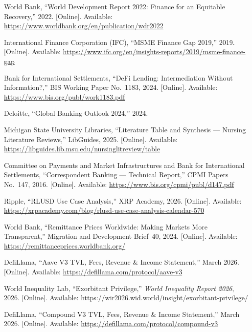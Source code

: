 \documentclass[12pt,a4paper]{report}
\begin{document}
{\begin{enumerate}[label={[\arabic*]}]
\item World Bank, ``World Development Report 2022: Finance for an Equitable Recovery,'' 2022. [Online]. Available: \url{https://www.worldbank.org/en/publication/wdr2022}

\item International Finance Corporation (IFC), ``MSME Finance Gap 2019,'' 2019. [Online]. Available: \url{https://www.ifc.org/en/insights-reports/2019/msme-finance-gap}

\item Bank for International Settlements, ``DeFi Lending: Intermediation Without Information?,'' BIS Working Paper No.~1183, 2024. [Online]. Available: \url{https://www.bis.org/publ/work1183.pdf}

\item Deloitte, ``Global Banking Outlook 2024,'' 2024.

\item Michigan State University Libraries, ``Literature Table and Synthesis --- Nursing Literature Reviews,'' LibGuides, 2025. [Online]. Available: \url{https://libguides.lib.msu.edu/nursinglitreview/table}

\item Committee on Payments and Market Infrastructures and Bank for International Settlements, ``Correspondent Banking --- Technical Report,'' CPMI Papers No.~147, 2016. [Online]. Available: \url{https://www.bis.org/cpmi/publ/d147.pdf}

\item Ripple, ``RLUSD Use Case Analysis,'' XRP Academy, 2026. [Online]. Available: \url{https://xrpacademy.com/blog/rlusd-use-case-analysis-calendar-570}

\item World Bank, ``Remittance Prices Worldwide: Making Markets More Transparent,'' Migration and Development Brief~40, 2024. [Online]. Available: \url{https://remittanceprices.worldbank.org/}

\item DefiLlama, ``Aave V3 TVL, Fees, Revenue \& Income Statement,'' March 2026. [Online]. Available: \url{https://defillama.com/protocol/aave-v3}

\item World Inequality Lab, ``Exorbitant Privilege,'' \textit{World Inequality Report 2026}, 2026. [Online]. Available: \url{https://wir2026.wid.world/insight/exorbitant-privilege/}

\item DefiLlama, ``Compound V3 TVL, Fees, Revenue \& Income Statement,'' March 2026. [Online]. Available: \url{https://defillama.com/protocol/compound-v3}


\end{enumerate}}
\end{document}
